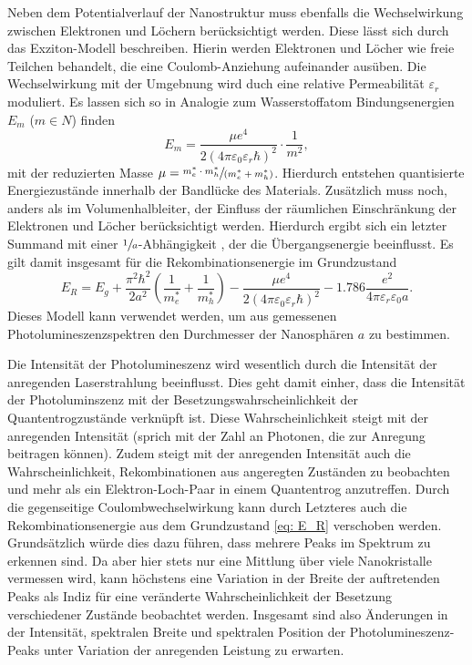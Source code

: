 Neben dem Potentialverlauf der Nanostruktur muss ebenfalls die Wechselwirkung zwischen Elektronen und Löchern berücksichtigt werden.
Diese lässt sich durch das Exziton-Modell beschreiben. Hierin werden Elektronen und Löcher wie freie Teilchen behandelt, die eine
Coulomb-Anziehung aufeinander ausüben. Die Wechselwirkung mit der Umgebnung wird duch eine relative Permeabilität
$\varepsilon_r$ moduliert. Es lassen sich so in Analogie zum Wasserstoffatom Bindungsenergien $E_m$ ($m \in N$) finden
\begin{equation}
  E_m = \frac{\mu e^4}{2 (4\pi\varepsilon_0 \varepsilon_r \hbar)^2} \cdot \frac{1}{m^2},
\end{equation}
mit der reduzierten Masse $\mu = \sfrac{m_e^* \cdot m_h^*}{(m_e^* + m_h^*)}$.
Hierdurch entstehen quantisierte Energiezustände innerhalb der
Bandlücke des Materials. Zusätzlich muss noch, anders als im Volumenhalbleiter, der Einfluss der räumlichen
Einschränkung der Elektronen und Löcher berücksichtigt werden. Hierdurch ergibt sich ein letzter Summand mit einer
$\sfrac{1}{a}$-Abhängigkeit \cite{}, der die Übergangsenergie beeinflusst. Es gilt damit insgesamt für die
Rekombinationsenergie im Grundzustand
\begin{equation}
  E_R = E_g + \frac{\pi^2\hbar^2}{ 2  a^2} \left(\frac{1}{m_e^*} + \frac{1}{m_h^*}\right) -\frac{\mu e^4}{2 (4\pi\varepsilon_0 \varepsilon_r \hbar)^2}
  - \num{1.786} \frac{e^2}{4\pi\varepsilon_r\varepsilon_0 a}.
  \label{eq: E_R}
\end{equation}
Dieses Modell kann verwendet werden, um aus gemessenen Photolumineszenzspektren den Durchmesser der Nanosphären $a$ zu bestimmen.

Die Intensität der Photolumineszenz wird wesentlich durch die Intensität der anregenden Laserstrahlung beeinflusst.
Dies geht damit einher, dass die Intensität der Photoluminszenz mit der Besetzungswahrscheinlichkeit der
Quantentrogzustände verknüpft ist. Diese Wahrscheinlichkeit steigt mit der anregenden Intensität (sprich mit der Zahl
an Photonen, die zur Anregung beitragen können).
Zudem steigt mit der anregenden Intensität auch die Wahrscheinlichkeit, Rekombinationen aus angeregten Zuständen
zu beobachten und mehr als ein Elektron-Loch-Paar
in einem Quantentrog anzutreffen.
Durch die gegenseitige Coulombwechselwirkung kann durch Letzteres auch die
Rekombinationsenergie aus dem Grundzustand \eqref{eq: E_R} verschoben werden. Grundsätzlich würde dies dazu führen, dass
mehrere Peaks im Spektrum zu erkennen sind. Da aber hier stets nur eine Mittlung über viele Nanokristalle vermessen wird,
kann höchstens eine Variation in der Breite der auftretenden Peaks als Indiz für eine veränderte Wahrscheinlichkeit der
Besetzung verschiedener Zustände beobachtet werden.
Insgesamt sind also Änderungen in der Intensität, spektralen Breite und spektralen Position der Photolumineszenz-Peaks
unter Variation der anregenden Leistung zu erwarten.
